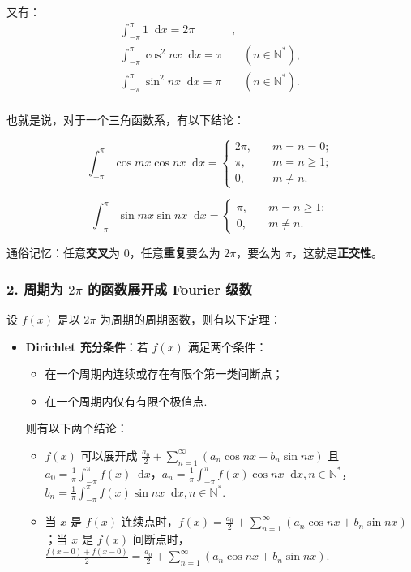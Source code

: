 \documentclass[b5paper]{ctexart}
\renewcommand{\d}{\mathop{}\!\mathrm{d}}
\newcommand{\N}{\mathbb{N}}
\newcommand{\jst}{\sum \limits_{n = 1}^{\infty}}
\begin{document}
		又有：
		\begin{equation*}
			\begin{split}
				\int_{-\pi}^{\pi} 1 \d x = 2\pi &, \\
				\int_{-\pi}^{\pi} \cos^2 nx \d x = \pi & \quad(n \in \N^*), \\
				\int_{-\pi}^{\pi} \sin^2 nx \d x = \pi & \quad(n \in \N^*). \\
			\end{split}
		\end{equation*}
		
	也就是说，对于一个三角函数系，有以下结论：
	
	$$
	\int_{-\pi}^{\pi} \cos mx \cos nx \d x=\left\{
	\begin{aligned}
		2\pi , \quad & m = n = 0; \\
		\pi, \quad&  m = n \ge 1; \\
		0, \quad &  m \ne n.
	\end{aligned}
	\right.
	$$
	
	$$
	\int_{-\pi}^{\pi} \sin mx \sin nx \d x=\left\{
	\begin{aligned}
		\pi, \quad&  m = n \ge 1; \\
		0, \quad &  m \ne n.
	\end{aligned}
	\right.
	$$
	
	通俗记忆：任意\textbf{交叉}为 $0$，任意\textbf{重复}要么为 $2\pi$，要么为 $\pi$，这就是\textbf{正交性}。
	
	\subsubsection*{2. 周期为 $2\pi$ 的函数展开成 Fourier 级数}
	
	设 $f(x)$ 是以 $2\pi$ 为周期的周期函数，则有以下定理：
	
	\begin{itemize}
		\item \textbf{Dirichlet 充分条件}：若 $f(x)$ 满足两个条件：
		\begin{itemize}
			\item 在一个周期内连续或存在有限个第一类间断点；
			
			\item 在一个周期内仅有有限个极值点.
		\end{itemize}
		
		则有以下两个结论：
		\begin{itemize}
			\item $f(x)$ 可以展开成 $\frac{a_0}{2} + \jst (a_n \cos nx + b_n \sin nx)$ 且 $a_0 = \frac{1}{\pi} \int_{-\pi}^{\pi} f(x) \d x$，$a_n = \frac{1}{\pi} \int_{-\pi}^{\pi} f(x)\cos nx \d x, n \in \N^*$，$b_n = \frac{1}{\pi} \int_{-\pi}^{\pi} f(x)\sin nx \d x, n \in \N^*$.
			
			\item 当 $x$ 是 $f(x)$ 连续点时，$f(x) = \frac{a_0}{2} + \jst (a_n \cos nx + b_n \sin nx)$；当 $x$ 是 $f(x)$ 间断点时，$\frac{f(x + 0) + f(x - 0)}{2} = \frac{a_0}{2} + \jst (a_n \cos nx + b_n \sin nx)$.
		\end{itemize}
	\end{itemize}
	
\end{document}
